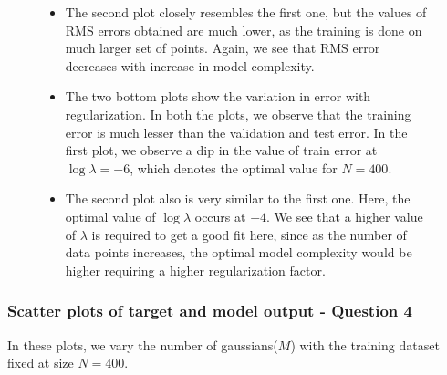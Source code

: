 \documentclass{article}
\begin{document}
\begin{figure}[H]
\begin{itemize}
\item The second plot closely resembles the first one, but the values of RMS errors obtained are much lower, as the training is done on much larger set of points. Again, we see that RMS error decreases with increase in model complexity.

\item The two bottom plots show the variation in error with regularization.
In both the plots, we observe that the training error is much lesser than the validation and test error. In the first plot, we observe a dip in the value of train error at $\log {\lambda} = -6 $, which denotes the optimal value for $N = 400$. 
\item The second plot also is very similar to the first one. Here, the optimal value of $\log{\lambda}$ occurs at $-4$. We see that a higher value of $\lambda$ is required to get a good fit here, since as the number of data points increases, the optimal model complexity would be higher requiring a higher regularization factor.
\end{itemize}


\end{figure}



\subsubsection{Scatter plots of target and model output - Question 4}

In these plots, we vary the number of gaussians($M$) with the training dataset fixed at size $N=400$. 
\end{document}
